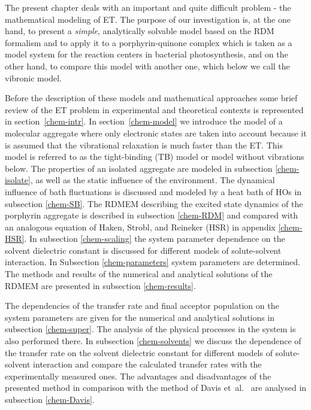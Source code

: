 \documentclass[12pt,twoside,a4paper]{report}
\begin{document}


The present chapter deals with an important 
and quite difficult problem - 
the mathematical modeling of ET. 
The purpose of our investigation is, at the one hand, 
to present a {\em simple}, analytically 
solvable model based on the RDM formalism \cite{f3,blum96} and to apply it to a 
porphyrin-quinone complex which is taken as a model system for the reaction 
centers in bacterial photosynthesis, and on the other hand, to compare this 
model with another one, which below we call the vibronic model. 
 
Before the description of these models and mathematical approaches some 
brief review of the ET problem in experimental and theoretical 
contexts 
is 
represented in section~\ref{chem-intr}. 
In  section~\ref{chem-model} we introduce the model of a molecular aggregate where 
only electronic states are taken into account because it is assumed that the 
vibrational relaxation is much faster than the ET. This model is referred to 
as the tight-binding (TB) model or model without vibrations below.
The properties of an isolated 
aggregate are modeled in subsection \ref{chem-isolate}, as well as the 
static influence of the environment. The dynamical influence of bath 
fluctuations is discussed and modeled by a heat bath of HOs 
in subsection \ref{chem-SB}. The RDMEM 
describing the excited state dynamics of the porphyrin aggregate is 
described in subsection \ref{chem-RDM} and compared with an analogous 
equation of Haken, Strobl, and Reineker (HSR) \cite{rein82,hake72,hake73,rein79} 
in appendix \ref{chem-HSR}. In subsection \ref{chem-scaling} the system 
parameter dependence on the solvent dielectric constant  
is discussed for different models of solute-solvent interaction. In 
Subsection \ref{chem-parameters} system parameters are determined. The 
methods and results of the numerical and analytical solutions of the RDMEM 
are presented in subsection \ref{chem-results}.  
 
The dependencies of the transfer rate and final acceptor population on the 
system parameters are given for the numerical and analytical solutions in 
subsection \ref{chem-super}. The analysis of the physical processes in the 
system is also performed there. In subsection \ref{chem-solvents} we discuss 
the dependence of the transfer rate on the solvent dielectric constant for 
different models of solute-solvent interaction and compare the calculated 
transfer rates with the experimentally measured ones. The advantages and 
disadvantages of the presented method in comparison with the method of Davis 
et~al.~\cite{d2} are analysed in subsection \ref{chem-Davis}.  
 
\end{document}
